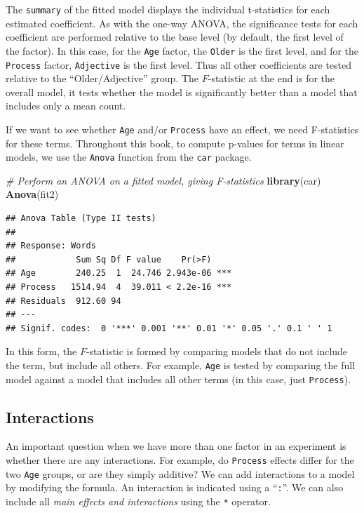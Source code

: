 \documentclass[]{book}
\newenvironment{Shaded}{\begin{snugshade}}{\end{snugshade}}
\newcommand{\CommentTok}[1]{\textcolor[rgb]{0.56,0.35,0.01}{\textit{#1}}}
\newcommand{\KeywordTok}[1]{\textcolor[rgb]{0.13,0.29,0.53}{\textbf{#1}}}
\newcommand{\NormalTok}[1]{#1}
\begin{document}
The \texttt{summary} of the fitted model displays the individual t-statistics for each estimated coefficient. As with the one-way ANOVA, the significance tests for each coefficient are performed relative to the base level (by default, the first level of the factor). In this case, for the \texttt{Age} factor, the \texttt{Older} is the first level, and for the \texttt{Process} factor, \texttt{Adjective} is the first level. Thus all other coefficients are tested relative to the ``Older/Adjective'' group. The \(F\)-statistic at the end is for the overall model, it tests whether the model is significantly better than a model that includes only a mean count.

If we want to see whether \texttt{Age} and/or \texttt{Process} have an effect, we need F-statistics for these terms. Throughout this book, to compute p-values for terms in linear models, we use the \texttt{Anova} function from the \texttt{car} package.

\begin{Shaded}
\begin{Highlighting}[]
\CommentTok{# Perform an ANOVA on a fitted model, giving F-statistics}
\KeywordTok{library}\NormalTok{(car)}
\KeywordTok{Anova}\NormalTok{(fit2)}
\end{Highlighting}
\end{Shaded}

\begin{verbatim}
## Anova Table (Type II tests)
## 
## Response: Words
##            Sum Sq Df F value    Pr(>F)    
## Age        240.25  1  24.746 2.943e-06 ***
## Process   1514.94  4  39.011 < 2.2e-16 ***
## Residuals  912.60 94                      
## ---
## Signif. codes:  0 '***' 0.001 '**' 0.01 '*' 0.05 '.' 0.1 ' ' 1
\end{verbatim}

In this form, the \(F\)-statistic is formed by comparing models that do not include the term, but include all others. For example, \texttt{Age} is tested by comparing the full model against a model that includes all other terms (in this case, just \texttt{Process}).

\hypertarget{interactions}{%
\subsection{Interactions}\label{interactions}}

An important question when we have more than one factor in an experiment is whether there are any interactions. For example, do \texttt{Process} effects differ for the two \texttt{Age} groups, or are they simply additive? We can add interactions to a model by modifying the formula. An interaction is indicated using a ``\texttt{:}''. We can also include all \emph{main effects and interactions} using the \texttt{*} operator.
\end{document}
